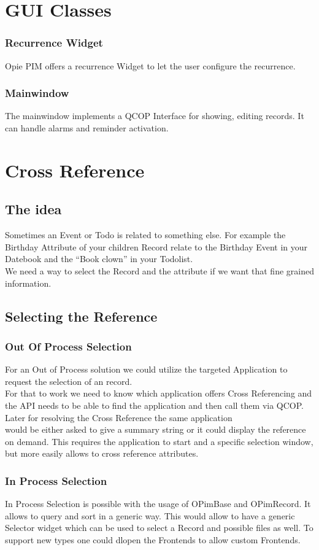 \section{GUI Classes}

\subsubsection{Recurrence Widget}
Opie PIM offers a recurrence Widget to let the user
configure the recurrence.

\subsubsection{Mainwindow}
The mainwindow implements a QCOP Interface for showing, 
editing records. It can handle alarms and reminder activation.

\section{Cross Reference}

\subsection{The idea}
Sometimes an Event or Todo is related to something else. 
For example the Birthday Attribute of your children Record relate
to the Birthday Event in your Datebook and the ``Book clown''
in your Todolist.\\
We need a way to select the Record and the attribute if we want
that fine grained information.

\subsection{Selecting the Reference}
\subsubsection{Out Of Process Selection}
For an Out of Process solution we could utilize the targeted
Application to request the selection of an record.\\
For that to work we need to know which application offers
Cross Referencing and the API needs to be able to find the
application and then call them via QCOP.\\
Later for resolving the Cross Reference the same application\\
would be either asked to give a summary string or it could
display the reference on demand. This requires the application
to start and a specific selection window, but more easily
allows to cross reference attributes.

\subsubsection{In Process Selection}
In Process Selection is possible with the usage of OPimBase 
and OPimRecord. It allows to query and sort in a generic way.
This would allow to have a generic Selector widget which
can be used to select a Record and possible files as well. To
support new types one could dlopen the Frontends to allow
custom Frontends.
